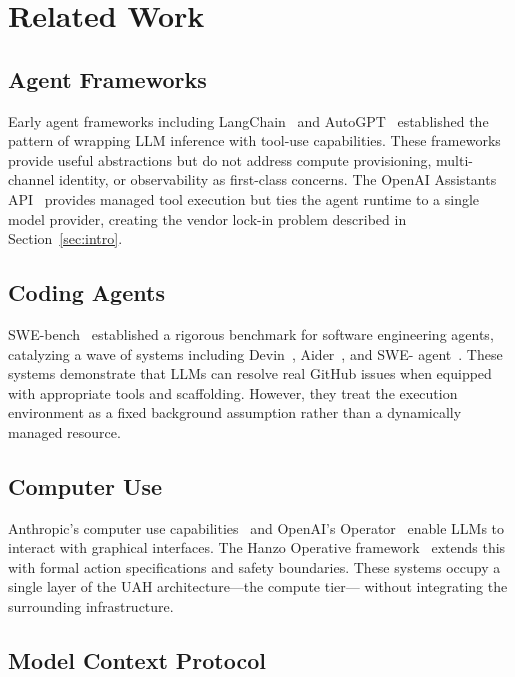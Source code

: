 \section{Related Work}

\label{sec:related}

\subsection{Agent Frameworks}

Early agent frameworks including LangChain~\cite{langchain2022} and
AutoGPT~\cite{autogpt2023} established the pattern of wrapping LLM inference
with tool-use capabilities. These frameworks provide useful abstractions but do
not address compute provisioning, multi-channel identity, or observability as
first-class concerns. The OpenAI Assistants API~\cite{openai2023gpt4} provides
managed tool execution but ties the agent runtime to a single model provider,
creating the vendor lock-in problem described in Section~\ref{sec:intro}.

\subsection{Coding Agents}

SWE-bench~\cite{jimenez2024swebench} established a rigorous benchmark for
software engineering agents, catalyzing a wave of systems including
Devin~\cite{cognition2024devin}, Aider~\cite{aider2024}, and SWE-
agent~\cite{yang2024sweagent}. These systems demonstrate that LLMs can resolve
real GitHub issues when equipped with appropriate tools and scaffolding.
However, they treat the execution environment as a fixed background assumption
rather than a dynamically managed resource.

\subsection{Computer Use}

Anthropic's computer use capabilities~\cite{anthropic2024computer} and
OpenAI's Operator~\cite{openai2025operator} enable LLMs to interact with
graphical interfaces. The Hanzo Operative framework~\cite{hanzo2024operative}
extends this with formal action specifications and safety boundaries. These
systems occupy a single layer of the UAH architecture---the compute tier---
without integrating the surrounding infrastructure.

\subsection{Model Context Protocol}

